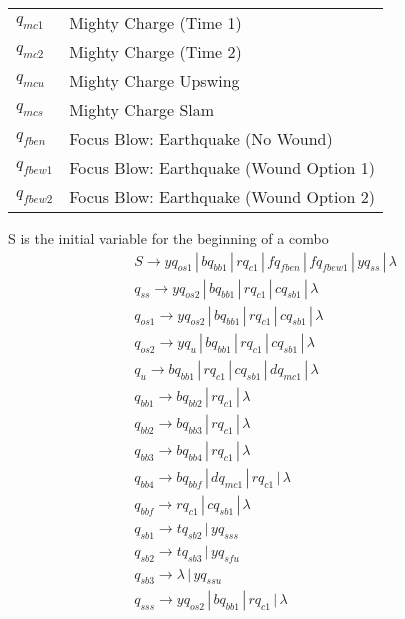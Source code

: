 \documentclass{article}
\begin{document}
\begin{mylist}
\begin{table}[h]
\begin{tabular}{l | l}
    $q_{mc1}$ & Mighty Charge (Time 1)\\
    $q_{mc2}$ & Mighty Charge (Time 2)\\
    $q_{mcu}$ & Mighty Charge Upswing\\
    $q_{mcs}$ & Mighty Charge Slam\\
    $q_{fben}$ & Focus Blow: Earthquake (No Wound)\\
    $q_{fbew1}$ & Focus Blow: Earthquake (Wound Option 1)\\
    $q_{fbew2}$ & Focus Blow: Earthquake (Wound Option 2)\\
  \end{tabular}
\end{table}
S is the initial variable for the beginning of a combo
\begin{align*}
&S \rightarrow yq_{os1} \, | \, bq_{bb1} \, | \, rq_{c1} \, | \, fq_{fben} \, | \, fq_{fbew1} \, | \, yq_{ss} \, | \, \lambda \\
&q_{ss} \rightarrow yq_{os2} \, | \, bq_{bb1} \, | \, rq_{c1} \, | \, cq_{sb1} \, | \, \lambda\\
&q_{os1} \rightarrow yq_{os2} \, | \, bq_{bb1} \, | \, rq_{c1} \, | \, cq_{sb1} \, | \, \lambda\\
&q_{os2} \rightarrow yq_{u} \, | \, bq_{bb1} \, | \, rq_{c1} \, | \, cq_{sb1} \, | \, \lambda\\
&q_{u} \rightarrow bq_{bb1} \, | \, rq_{c1} \, | \,cq_{sb1} \, | \, dq_{mc1} \, | \, \lambda\\
&q_{bb1} \rightarrow bq_{bb2} \, | \, rq_{c1} \, | \, \lambda \\ 
&q_{bb2} \rightarrow bq_{bb3} \, | \, rq_{c1} \, | \, \lambda \\ 
&q_{bb3} \rightarrow bq_{bb4} \, | \, rq_{c1} \, | \, \lambda \\ 
&q_{bb4} \rightarrow bq_{bbf} \, | \, dq_{mc1} \, | \, rq_{c1} \, | \, \lambda \\ 
&q_{bbf} \rightarrow rq_{c1} \, | \, cq_{sb1} \, | \, \lambda \\ 
&q_{sb1} \rightarrow tq_{sb2} \, | \, yq_{sss} \\ 
&q_{sb2} \rightarrow tq_{sb3} \, | \, yq_{sfu} \\ 
&q_{sb3} \rightarrow \lambda \, | \, yq_{ssu} \\ 
&q_{sss} \rightarrow yq_{os2} \, | \, bq_{bb1} \, | \, rq_{c1} \, | \, \lambda\\ 

\end{align*}
\end{mylist}
\end{document}
